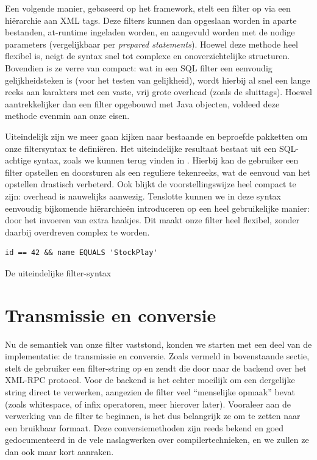 Een volgende manier, gebaseerd op het  framework, stelt een filter op via een hi\"erarchie aan XML tags. Deze filters kunnen dan opgeslaan worden in aparte bestanden, at-runtime ingeladen worden, en aangevuld worden met de nodige parameters (vergelijkbaar per \emph{prepared statements}). Hoewel deze methode heel flexibel is, neigt de syntax snel tot complexe en onoverzichtelijke structuren. Bovendien is ze verre van compact: wat in een SQL filter een eenvoudig gelijkheidsteken is (voor het testen van gelijkheid), wordt hierbij al snel een lange reeks aan karakters met een vaste, vrij grote overhead (zoals de sluittags). Hoewel aantrekkelijker dan een filter opgebouwd met Java objecten, voldeed deze methode evenmin aan onze eisen.

Uiteindelijk zijn we meer gaan kijken naar bestaande en beproefde pakketten om onze filtersyntax te defini\"eren. Het uiteindelijke resultaat bestaat uit een SQL-achtige syntax, zoals we kunnen terug vinden in . Hierbij kan de gebruiker een filter opstellen en doorsturen als een reguliere tekenreeks, wat de eenvoud van het opstellen drastisch verbeterd. Ook blijkt de voorstellingswijze heel compact te zijn: overhead is nauwelijks aanwezig. Tenslotte kunnen we in deze syntax eenvoudig bijkomende hi\"erarchie\"en introduceren op een heel gebruikelijke manier: door het invoeren van extra haakjes. Dit maakt onze filter heel flexibel, zonder daarbij overdreven complex te worden.

\begin{code}
\begin{verbatim}
id == 42 && name EQUALS 'StockPlay'
\end{verbatim}
\caption{De uiteindelijke filter-syntax}
\end{code}


\section{Transmissie en conversie}

Nu de semantiek van onze filter vaststond, konden we starten met een deel van de implementatie: de transmissie en conversie.
Zoals vermeld in bovenstaande sectie, stelt de gebruiker een filter-string op en zendt die door naar de backend over het XML-RPC protocol. Voor de backend is het echter moeilijk om een dergelijke string direct te verwerken, aangezien de filter veel ``menselijke opmaak'' bevat (zoals whitespace, of infix operatoren, meer hierover later). Vooraleer aan de verwerking van de filter te beginnen, is het dus belangrijk ze om te zetten naar een bruikbaar formaat.
Deze conversiemethoden zijn reeds bekend en goed gedocumenteerd in de vele naslagwerken over compilertechnieken, en we zullen ze dan ook maar kort aanraken.

